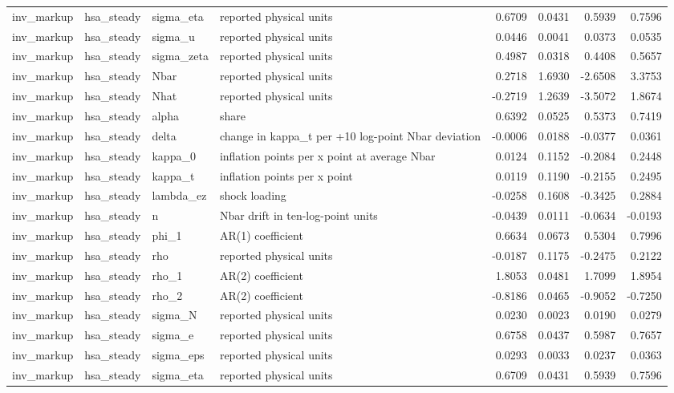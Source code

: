 \begin{tabular}{llllrrrr}
inv\_markup & hsa\_steady & sigma\_eta & reported physical units & 0.6709 & 0.0431 & 0.5939 & 0.7596 \\
inv\_markup & hsa\_steady & sigma\_u & reported physical units & 0.0446 & 0.0041 & 0.0373 & 0.0535 \\
inv\_markup & hsa\_steady & sigma\_zeta & reported physical units & 0.4987 & 0.0318 & 0.4408 & 0.5657 \\
inv\_markup & hsa\_steady & Nbar & reported physical units & 0.2718 & 1.6930 & -2.6508 & 3.3753 \\
inv\_markup & hsa\_steady & Nhat & reported physical units & -0.2719 & 1.2639 & -3.5072 & 1.8674 \\
inv\_markup & hsa\_steady & alpha & share & 0.6392 & 0.0525 & 0.5373 & 0.7419 \\
inv\_markup & hsa\_steady & delta & change in kappa\_t per +10 log-point Nbar deviation & -0.0006 & 0.0188 & -0.0377 & 0.0361 \\
inv\_markup & hsa\_steady & kappa\_0 & inflation points per x point at average Nbar & 0.0124 & 0.1152 & -0.2084 & 0.2448 \\
inv\_markup & hsa\_steady & kappa\_t & inflation points per x point & 0.0119 & 0.1190 & -0.2155 & 0.2495 \\
inv\_markup & hsa\_steady & lambda\_ez & shock loading & -0.0258 & 0.1608 & -0.3425 & 0.2884 \\
inv\_markup & hsa\_steady & n & Nbar drift in ten-log-point units & -0.0439 & 0.0111 & -0.0634 & -0.0193 \\
inv\_markup & hsa\_steady & phi\_1 & AR(1) coefficient & 0.6634 & 0.0673 & 0.5304 & 0.7996 \\
inv\_markup & hsa\_steady & rho & reported physical units & -0.0187 & 0.1175 & -0.2475 & 0.2122 \\
inv\_markup & hsa\_steady & rho\_1 & AR(2) coefficient & 1.8053 & 0.0481 & 1.7099 & 1.8954 \\
inv\_markup & hsa\_steady & rho\_2 & AR(2) coefficient & -0.8186 & 0.0465 & -0.9052 & -0.7250 \\
inv\_markup & hsa\_steady & sigma\_N & reported physical units & 0.0230 & 0.0023 & 0.0190 & 0.0279 \\
inv\_markup & hsa\_steady & sigma\_e & reported physical units & 0.6758 & 0.0437 & 0.5987 & 0.7657 \\
inv\_markup & hsa\_steady & sigma\_eps & reported physical units & 0.0293 & 0.0033 & 0.0237 & 0.0363 \\
inv\_markup & hsa\_steady & sigma\_eta & reported physical units & 0.6709 & 0.0431 & 0.5939 & 0.7596 \\

\end{tabular}
